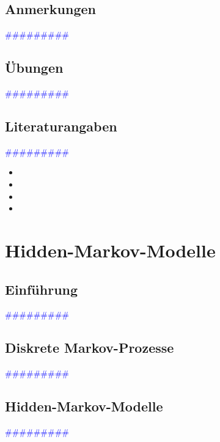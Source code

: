 \documentclass{article}
\begin{document}
  \subsection{Anmerkungen} %
      \textcolor{blue}{\#\#\#\#\#\#\#\#\#}
  \subsection{Übungen} %
      \textcolor{blue}{\#\#\#\#\#\#\#\#\#}
  \subsection{Literaturangaben} %
      \textcolor{blue}{\#\#\#\#\#\#\#\#\#}

      \begin{itemize}
      \color{red}
        \item 
        \item
      \color{ForestGreen}
        \item 
        \item
      \end{itemize}




\newpage
\section{Hidden-Markov-Modelle} %
  \subsection{Einführung} %
      \textcolor{blue}{\#\#\#\#\#\#\#\#\#}
  \subsection{Diskrete Markov-Prozesse} %
      \textcolor{blue}{\#\#\#\#\#\#\#\#\#}
  \subsection{Hidden-Markov-Modelle} %
      \textcolor{blue}{\#\#\#\#\#\#\#\#\#}
\end{document}
